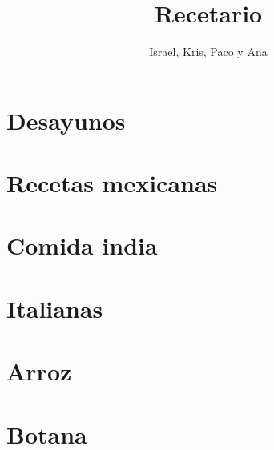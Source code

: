 \documentclass[twoside,12pt]{article}
\date{}
\author{Israel, Kris, Paco y Ana}
\title{Recetario}
\begin{document}
\maketitle

\tableofcontents

\newpage
\section{Desayunos}




\section{Recetas mexicanas}

















\section{Comida india}



\section{Italianas}





\section{Arroz}






\section{Botana}

\end{document}
